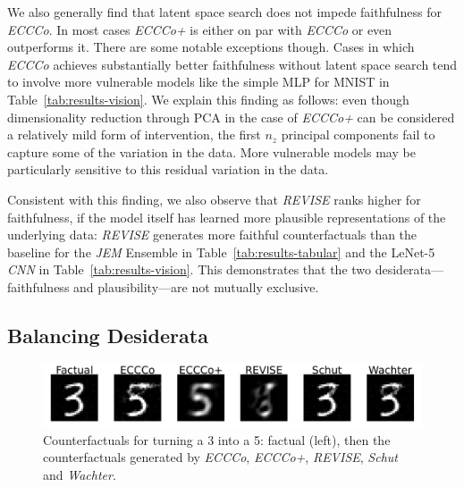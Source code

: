 \documentclass[letterpaper]{article} %
\begin{document}
We also generally find that latent space search does not impede faithfulness for \textit{ECCCo}. In most cases \textit{ECCCo+} is either on par with \textit{ECCCo} or even outperforms it. There are some notable exceptions though. Cases in which \textit{ECCCo} achieves substantially better faithfulness without latent space search tend to involve more vulnerable models like the simple MLP for MNIST in Table~\ref{tab:results-vision}. We explain this finding as follows: even though dimensionality reduction through PCA in the case of \textit{ECCCo+} can be considered a relatively mild form of intervention, the first $n_z$ principal components fail to capture some of the variation in the data. More vulnerable models may be particularly sensitive to this residual variation in the data. 

Consistent with this finding, we also observe that \textit{REVISE} ranks higher for faithfulness, if the model itself has learned more plausible representations of the underlying data: \textit{REVISE} generates more faithful counterfactuals than the baseline for the \textit{JEM} Ensemble in Table~\ref{tab:results-tabular} and the LeNet-5 \textit{CNN} in Table~\ref{tab:results-vision}. This demonstrates that the two desiderata---faithfulness and plausibility---are not mutually exclusive.

\subsection{Balancing Desiderata}

\begin{figure}
  \centering
  \includegraphics[width=1.0\linewidth]{figures/mnist_benchmark.png}
  \caption{Counterfactuals for turning a 3 into a 5: factual (left), then the counterfactuals generated by \textit{ECCCo}, \textit{ECCCo+}, \textit{REVISE}, \textit{Schut} and \textit{Wachter}.}\label{fig:mnist-bmk}
\end{figure}

\end{document}
